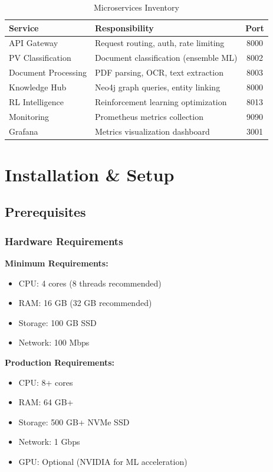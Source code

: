 \documentclass[11pt,a4paper,twoside]{book}
\begin{document}
\begin{table}[h]
\centering
\caption{Microservices Inventory}
\begin{tabularx}{\textwidth}{lXc}
\toprule
\textbf{Service} & \textbf{Responsibility} & \textbf{Port} \\
\midrule
API Gateway & Request routing, auth, rate limiting & 8000 \\
PV Classification & Document classification (ensemble ML) & 8002 \\
Document Processing & PDF parsing, OCR, text extraction & 8003 \\
Knowledge Hub & Neo4j graph queries, entity linking & 8000 \\
RL Intelligence & Reinforcement learning optimization & 8013 \\
Monitoring & Prometheus metrics collection & 9090 \\
Grafana & Metrics visualization dashboard & 3001 \\
\bottomrule
\end{tabularx}
\end{table}

\chapter{Installation \& Setup}

\section{Prerequisites}

\subsection{Hardware Requirements}

\begin{infobox}
\textbf{Minimum Requirements:}
\begin{itemize}[noitemsep]
    \item CPU: 4 cores (8 threads recommended)
    \item RAM: 16 GB (32 GB recommended)
    \item Storage: 100 GB SSD
    \item Network: 100 Mbps
\end{itemize}

\textbf{Production Requirements:}
\begin{itemize}[noitemsep]
    \item CPU: 8+ cores
    \item RAM: 64 GB+
    \item Storage: 500 GB+ NVMe SSD
    \item Network: 1 Gbps
    \item GPU: Optional (NVIDIA for ML acceleration)
\end{itemize}
\end{infobox}
\end{document}
